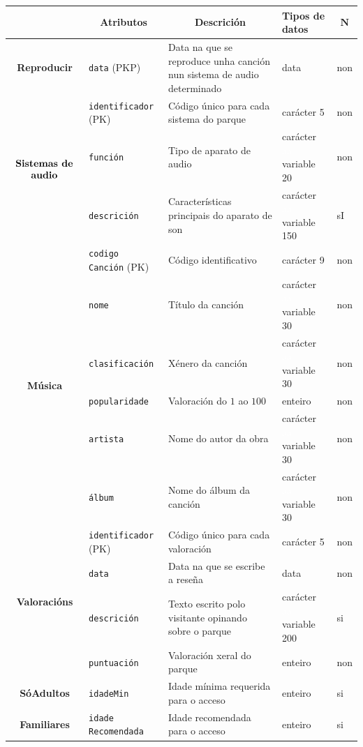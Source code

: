 \documentclass[12pt,a4paper]{book}
\theoremstyle{definition}
\theoremstyle{break}
\begin{document}
	\newpage
	
	\begin{table} [H] \centering
		\begin{tabular}{|c|m{3cm}|m{4cm}|m{2cm}|m{0.7cm}|}
			\hline \rowcolor{gris}
			\multicolumn{1}{|m{2.5cm}|}{Entidade ou relación} & \multicolumn{1}{c|}{Atributos} & \multicolumn{1}{c|}{Descrición} & \multicolumn{1}{m{2cm}|}{Tipos de datos} & \multicolumn{1}{c|}{$\mathbf{N}$} \\
			\hline
			\textbf{Reproducir} & \texttt{data} (PKP) & Data na que se reproduce unha canción nun sistema de audio determinado & data & non\\
			\hline
			\multirow{3}{*}{$\begin{array}{c}
					\text{\textbf{Sistemas de}}\\\text{\textbf{audio}}
			\end{array}$} & \texttt{identificador} (PK) & Código único para cada sistema do parque & carácter 5 & non\\
			\cline{2-5}
			&\texttt{función} & Tipo de aparato de audio &  carácter \textcolor{white}{aa} variable 20 & non\\
			\cline{2-5}
			& \texttt{descrición} & Características principais do aparato de son &  carácter \textcolor{white}{aa} variable 150 & sI\\
			\cline{2-5}
			\hline
			\multirow{6}{*}{\textbf{Música}} & \texttt{codigo Canción} (PK) & Código identificativo & carácter 9 & non\\
			\cline{2-5}
			& \texttt{nome} & Título da canción &  carácter \textcolor{white}{aa} variable 30 & non\\
			\cline{2-5}
			&\texttt{clasificación} & Xénero da canción &  carácter \textcolor{white}{aa} variable 30 & non\\
			\cline{2-5}
			& \texttt{popularidade} & Valoración do $1$ ao $100$ & enteiro & non\\
			\cline{2-5}
			& \texttt{artista} & Nome do autor da obra &  carácter \textcolor{white}{aa} variable 30 & non\\
			\cline{2-5}
			& \texttt{álbum} & Nome do álbum da canción &  carácter \textcolor{white}{aa} variable 30 & non\\
			\hline
			\multirow{4}{*}{\textbf{Valoracións}} & \texttt{identificador} (PK) & Código único para cada valoración & carácter 5 & non\\
			\cline{2-5}
			& \texttt{data} & Data na que se escribe a reseña & data & non\\
			\cline{2-5}
			&\texttt{descrición} & Texto escrito polo visitante opinando sobre o parque &  carácter \textcolor{white}{aa} variable 200 & si\\
			\cline{2-5}
			& \texttt{puntuación} & Valoración xeral do parque &  enteiro & non\\
			\cline{2-5}
			\hline
			\textbf{SóAdultos} & \texttt{idadeMin} & Idade mínima requerida para o acceso & enteiro & si\\
			\hline
			\textbf{Familiares} & \texttt{idade Recomendada } & Idade recomendada para o acceso & enteiro & si\\
			\hline 
			

\end{tabular}
\end{table}
\end{document}
